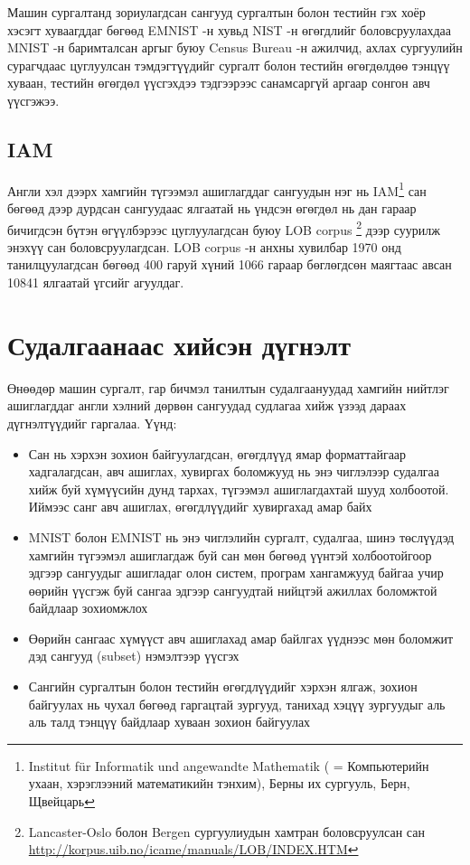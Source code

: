 Машин сургалтанд зориулагдсан сангууд сургалтын болон тестийн гэх хоёр хэсэгт хуваагддаг бөгөөд EMNIST -н хувьд NIST -н өгөгдлийг боловсруулахдаа MNIST -н баримталсан аргыг буюу Census Bureau -н ажилчид, ахлах сургуулийн сурагчдаас цуглуулсан тэмдэгтүүдийг сургалт болон тестийн өгөгдөлдөө тэнцүү хуваан, тестийн өгөгдөл үүсгэхдээ тэдгээрээс санамсаргүй аргаар сонгон авч үүсгэжээ.

\subsection{IAM \cite{iam-database}}

Англи хэл дээрх хамгийн түгээмэл ашиглагддаг сангуудын нэг нь IAM\footnote{Institut für Informatik und angewandte Mathematik ( = Компьютерийн ухаан, хэрэглээний математикийн тэнхим), Берны их сургууль, Берн, Щвейцарь} сан бөгөөд дээр дурдсан сангуудаас ялгаатай нь үндсэн өгөгдөл нь дан гараар бичигдсэн бүтэн өгүүлбэрээс цуглуулагдсан буюу LOB corpus \cite{lob-corpus}\footnote{Lancaster-Oslo болон Bergen сургуулиудын хамтран боловсруулсан сан \url{http://korpus.uib.no/icame/manuals/LOB/INDEX.HTM}} дээр суурилж энэхүү сан боловсруулагдсан. LOB corpus -н анхны хувилбар 1970 онд танилцуулагдсан бөгөөд 400 гаруй хүний 1066 гараар бөглөгдсөн маягтаас авсан 10841 ялгаатай үгсийг агуулдаг.

\section{Судалгаанаас хийсэн дүгнэлт}

Өнөөдөр машин сургалт, гар бичмэл танилтын судалгаануудад хамгийн нийтлэг ашиглагддаг англи хэлний дөрвөн сангуудад судлагаа хийж үзээд дараах дүгнэлтүүдийг гаргалаа. Үүнд:

\begin{itemize}
	\item Сан нь хэрхэн зохион байгуулагдсан, өгөгдлүүд ямар форматтайгаар хадгалагдсан, авч ашиглах, хувиргах боломжууд нь энэ чиглэлээр судалгаа хийж буй хүмүүсийн дунд тархах, түгээмэл ашиглагдахтай шууд холбоотой. Иймээс санг авч ашиглах, өгөгдлүүдийг хувиргахад амар байх
	\item MNIST болон EMNIST нь энэ чиглэлийн сургалт, судалгаа, шинэ төслүүдэд хамгийн түгээмэл ашиглагдаж буй сан мөн бөгөөд үүнтэй холбоотойгоор эдгээр сангуудыг ашигладаг олон систем, програм хангамжууд байгаа учир өөрийн үүсгэж буй сангаа эдгээр сангуудтай нийцтэй ажиллах боломжтой байдлаар зохиомжлох\label{criteria:mnist-compatible}
	\item Өөрийн сангаас хүмүүст авч ашиглахад амар байлгах үүднээс мөн боломжит дэд сангууд (subset) нэмэлтээр үүсгэх
	\item Сангийн сургалтын болон тестийн өгөгдлүүдийг хэрхэн ялгаж, зохион байгуулах нь чухал бөгөөд гаргацтай зургууд, танихад хэцүү зургуудыг аль аль талд тэнцүү байдлаар хуваан зохион байгуулах
\end{itemize}
